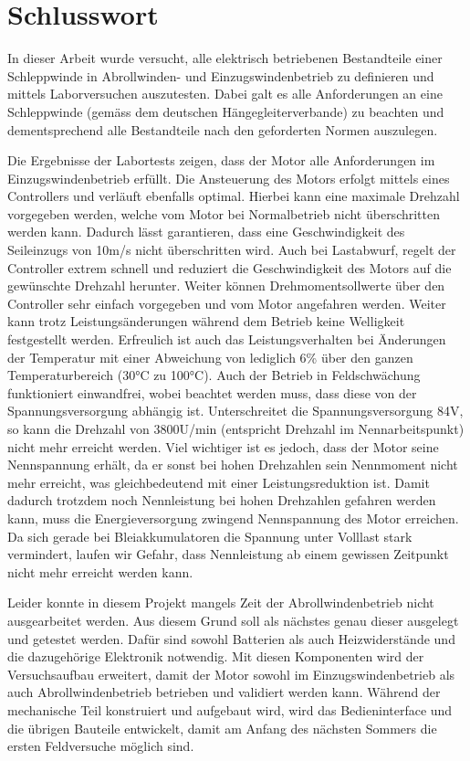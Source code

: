 \section{Schlusswort}\label{sec:Schlusswort}

In dieser Arbeit wurde versucht, alle elektrisch betriebenen Bestandteile einer Schleppwinde in Abrollwinden- und Einzugswindenbetrieb zu definieren und mittels Laborversuchen auszutesten. Dabei galt es alle Anforderungen an eine Schleppwinde (gemäss dem deutschen Hängegleiterverbande) zu beachten und dementsprechend alle Bestandteile nach den geforderten Normen auszulegen.

Die Ergebnisse der Labortests zeigen, dass der Motor alle Anforderungen im Einzugswindenbetrieb erfüllt. Die Ansteuerung des Motors erfolgt mittels eines Controllers und verläuft ebenfalls optimal. Hierbei kann eine maximale Drehzahl vorgegeben werden, welche vom Motor bei Normalbetrieb nicht überschritten werden kann. Dadurch lässt garantieren, dass eine Geschwindigkeit des Seileinzugs von 10m/s nicht überschritten wird. Auch bei Lastabwurf, regelt der Controller extrem schnell und reduziert die Geschwindigkeit des Motors auf die gewünschte Drehzahl herunter. Weiter können Drehmomentsollwerte über den Controller sehr einfach vorgegeben und vom Motor angefahren werden. Weiter kann trotz Leistungsänderungen während dem Betrieb keine Welligkeit festgestellt werden. Erfreulich ist auch das Leistungsverhalten bei Änderungen der Temperatur mit einer Abweichung von lediglich 6\% über den ganzen Temperaturbereich (30°C zu 100°C). Auch der Betrieb in Feldschwächung funktioniert einwandfrei, wobei beachtet werden muss, dass diese von der Spannungsversorgung abhängig ist. Unterschreitet die Spannungsversorgung 84V, so kann die Drehzahl von 3800U/min (entspricht Drehzahl im Nennarbeitspunkt) nicht mehr erreicht werden. Viel wichtiger ist es jedoch, dass der Motor seine Nennspannung erhält, da er sonst bei hohen Drehzahlen sein Nennmoment nicht mehr erreicht, was gleichbedeutend mit einer Leistungsreduktion ist. Damit dadurch trotzdem noch Nennleistung bei hohen Drehzahlen gefahren werden kann, muss die Energieversorgung zwingend Nennspannung des Motor erreichen. Da sich gerade bei Bleiakkumulatoren die Spannung unter Volllast stark vermindert, laufen wir Gefahr, dass Nennleistung ab einem gewissen Zeitpunkt nicht mehr erreicht werden kann.

Leider konnte in diesem Projekt mangels Zeit der Abrollwindenbetrieb nicht ausgearbeitet werden. Aus diesem Grund soll als nächstes genau dieser ausgelegt und getestet werden. Dafür sind sowohl Batterien als auch Heizwiderstände und die dazugehörige Elektronik notwendig. Mit diesen Komponenten wird der Versuchsaufbau erweitert, damit der Motor sowohl im Einzugswindenbetrieb als auch Abrollwindenbetrieb betrieben und validiert werden kann. Während der mechanische Teil konstruiert und aufgebaut wird, wird das Bedieninterface und die übrigen Bauteile entwickelt, damit am Anfang des nächsten Sommers die ersten Feldversuche möglich sind.

